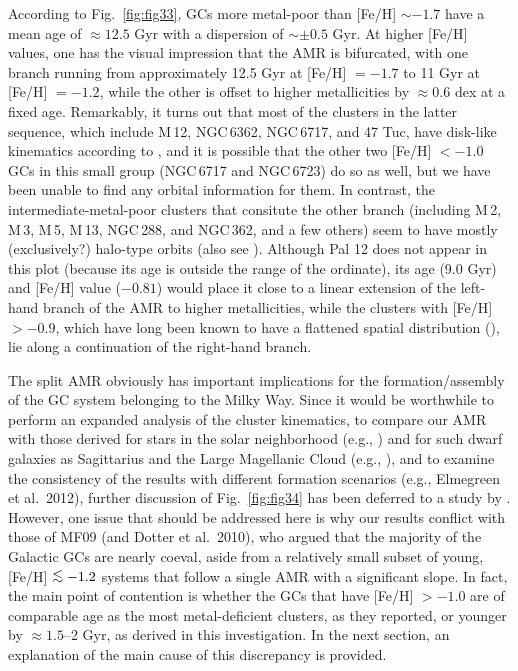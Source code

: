 \documentclass[12pt,preprint]{aastex}
\newcommand\lta{\mathrel{\hbox{\raise 0.6 ex \hbox{$<$}\kern
                   -1.8 ex\lower .5 ex\hbox{$\sim$}}}}
\begin{document}
According to Fig.~\ref{fig:fig33}, GCs more metal-poor than [Fe/H] $\sim -1.7$
have a mean age of $\approx 12.5$ Gyr with a dispersion of $\sim \pm 0.5$ Gyr.
At higher [Fe/H] values, one has the visual impression that the AMR
is bifurcated, with one branch running from approximately 12.5 Gyr at [Fe/H] $=
-1.7$ to 11 Gyr at [Fe/H] $= -1.2$, while the other is offset to higher
metallicities by $\approx 0.6$ dex at a fixed age.  Remarkably, it turns out
that most of the clusters in the latter sequence, which include M$\,$12,
NGC$\,$6362, NGC$\,$6717, and 47 Tuc, have disk-like kinematics according to
\citet{dgv99}, and it is possible that the other two [Fe/H] $< -1.0$ GCs in this
small group (NGC$\,$6717 and NGC$\,$6723) do so as well, but we have been unable
to find any orbital information for them.  In contrast, the
intermediate-metal-poor clusters that consitute the other branch (including
M$\,$2, M$\,$3, M$\,$5, M$\,$13, NGC$\,$288, and NGC$\,$362, and a few others)
seem to have mostly (exclusively?) halo-type orbits (also see \citealt{dvg99}).
Although Pal 12 does not appear in this plot (because its age is outside the
range of the ordinate), its age (9.0 Gyr) and [Fe/H] value ($-0.81$) would place
it close to a linear extension of the left-hand branch of the AMR to higher
metallicities, while the clusters with [Fe/H] $> -0.9$, which have long been
known to have a flattened spatial distribution (\citealt{z85}), lie along a
continuation of the right-hand branch.

The split AMR obviously has important implications for the formation/assembly
of the GC system belonging to the Milky Way.  Since it would be worthwhile to
perform an expanded analysis of the cluster kinematics, to compare our AMR with
those derived for stars in the solar neighborhood (e.g., \citealt{csa11}) and
for such dwarf galaxies as Sagittarius and the Large Magellanic Cloud
(e.g., \citealt{lvb13}), and to examine the consistency of the results with 
different formation scenarios (e.g., Elmegreen et al.~2012), further discussion
of Fig.~\ref{fig:fig34} has been deferred to a study by 
\citet{lvm13}.  However, one issue that should be addressed here is why
our results conflict with those of MF09 (and Dotter et al.~2010), who argued
that the majority of the Galactic GCs are nearly coeval, aside from a
relatively small subset of young, [Fe/H] $\lta -1.2$ systems that follow a
single AMR with a significant slope.  In fact, the main point of contention is
whether the GCs that have [Fe/H] $> -1.0$ are of comparable age as the most
metal-deficient clusters, as they reported, or younger by $\approx 1.5$--2 Gyr,
as derived in this investigation.  In the next section, an explanation of the
main cause of this discrepancy is provided.
 
\end{document}
